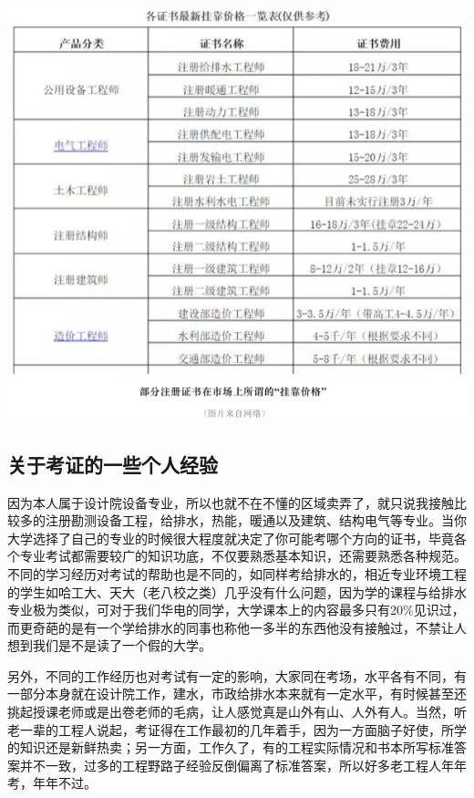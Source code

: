 \documentclass[
]{book}
\begin{document}
\includegraphics[width=8.33in]{images/kaozheng3}

\hypertarget{ux5173ux4e8eux8003ux8bc1ux7684ux4e00ux4e9bux4e2aux4ebaux7ecfux9a8c}{%
\subsection{关于考证的一些个人经验}\label{ux5173ux4e8eux8003ux8bc1ux7684ux4e00ux4e9bux4e2aux4ebaux7ecfux9a8c}}

因为本人属于设计院设备专业，所以也就不在不懂的区域卖弄了，就只说我接触比较多的注册勘测设备工程，给排水，热能，暖通以及建筑、结构电气等专业。当你大学选择了自己的专业的时候很大程度就决定了你可能考哪个方向的证书，毕竟各个专业考试都需要较广的知识功底，不仅要熟悉基本知识，还需要熟悉各种规范。不同的学习经历对考试的帮助也是不同的，如同样考给排水的，相近专业环境工程的学生如哈工大、天大（老八校之类）几乎没有什么问题，因为学的课程与给排水专业极为类似，可对于我们华电的同学，大学课本上的内容最多只有20\%见识过，而更奇葩的是有一个学给排水的同事也称他一多半的东西他没有接触过，不禁让人想到我们是不是读了一个假的大学。

另外，不同的工作经历也对考试有一定的影响，大家同在考场，水平各有不同，有一部分本身就在设计院工作，建水，市政给排水本来就有一定水平，有时候甚至还挑起授课老师或是出卷老师的毛病，让人感觉真是山外有山、人外有人。当然，听老一辈的工程人说起，考证得在工作最初的几年着手，因为一方面脑子好使，所学的知识还是新鲜热卖；另一方面，工作久了，有的工程实际情况和书本所写标准答案并不一致，过多的工程野路子经验反倒偏离了标准答案，所以好多老工程人年年考，年年不过。
\end{document}
